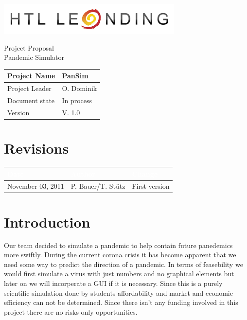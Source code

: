 \documentclass[12pt]{article}
\theoremstyle{definition}
\newcommand{\projectname}{PanSim}
\newcommand{\productname}{Pandemic Simulator}
\newcommand{\projectleader}{O. Dominik}
\newcommand{\documentstatus}{In process}
\newcommand{\version}{V. 1.0}
\begin{document}
\begin{titlepage}
\begin{flushright}
\includegraphics[scale=.5]{htlleondinglogo.png}\\
\end{flushright}

\vspace{10em}

\begin{center}
{\Huge Project Proposal} \\[3em]
{\LARGE \productname} \\[3em]
\end{center}

\begin{flushleft}
\begin{tabular}{|l|l|}
\hline
Project Name & \projectname \\ \hline
Project Leader & \projectleader \\ \hline
Document state & \documentstatus \\ \hline
Version & \version \\ \hline
\end{tabular}
\end{flushleft}

\end{titlepage}
\section*{Revisions}
\begin{tabular}{|l|l|l|}
\hline
\cellcolor[gray]{0.5}\textcolor{white}{Date} & \cellcolor[gray]{0.5}\textcolor{white}{Author} & \cellcolor[gray]{0.5}\textcolor{white}{Change} \\ \hline
November 03, 2011&P. Bauer/T. Stütz&First version \\ \hline
\end{tabular}
\pagebreak

\tableofcontents
\pagebreak

\section{Introduction}

Our team decided to simulate a pandemic to help contain future panedemics more swiftly.
During the current corona crisis it has become apparent that we need some way to predict the direction of a pandemic.
In terms of feasebility we would first simulate a virus with just numbers and no graphical elements but later on we will incorperate a GUI if it is necessary.
Since this is a purely scientific simulation done by students affordability and market and economic efficiency can not be determined.
Since there isn't any funding involved in this project there are no risks only opportunities.
\end{document}
